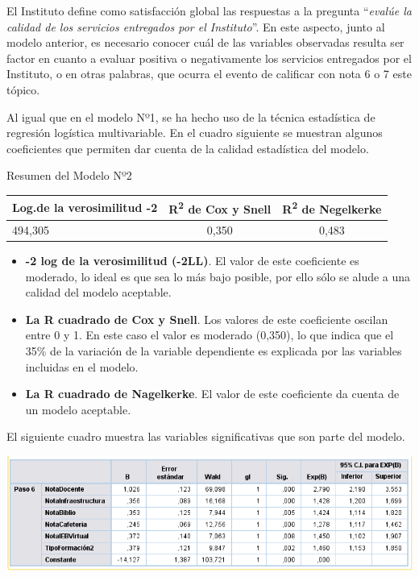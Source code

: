 \documentclass[]{book}
\begin{document}
El Instituto define como satisfacción global las respuestas a la
pregunta ``\emph{evalúe la calidad de los servicios entregados por el
Instituto}''. En este aspecto, junto al modelo anterior, es necesario
conocer cuál de las variables observadas resulta ser factor en cuanto a
evaluar positiva o negativamente los servicios entregados por el
Instituto, o en otras palabras, que ocurra el evento de calificar con
nota 6 o 7 este tópico.

Al igual que en el modelo Nº1, se ha hecho uso de la técnica estadística
de regresión logística multivariable. En el cuadro siguiente se muestran
algunos coeficientes que permiten dar cuenta de la calidad estadística
del modelo.

Resumen del Modelo Nº2

\begin{longtable}[]{@{}lcc@{}}
\toprule
Log.de la verosimilitud -2 & R\textsuperscript{2} de Cox y Snell &
R\textsuperscript{2} de Negelkerke\tabularnewline
\midrule
\endhead
494,305 & 0,350 & 0,483\tabularnewline
\bottomrule
\end{longtable}

\begin{itemize}
\item
  \textbf{-2 log de la verosimilitud (-2LL)}. El valor de este
  coeficiente es moderado, lo ideal es que sea lo más bajo posible, por
  ello sólo se alude a una calidad del modelo aceptable.
\item
  \textbf{La R cuadrado de Cox y Snell}. Los valores de este coeficiente
  oscilan entre 0 y 1. En este caso el valor es moderado (0,350), lo que
  indica que el 35\% de la variación de la variable dependiente es
  explicada por las variables incluidas en el modelo.
\item
  \textbf{La R cuadrado de Nagelkerke}. El valor de este coeficiente da
  cuenta de un modelo aceptable.
\end{itemize}

El siguiente cuadro muestra las variables significativas que son parte
del modelo.

\begin{center}\includegraphics{images/Modelo2} \end{center}
\end{document}

